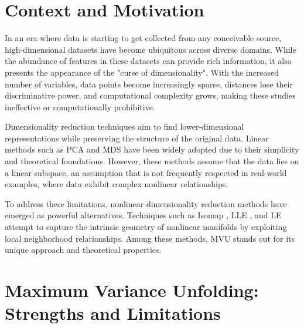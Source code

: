 \label{chap:Introduction}

\section{Context and Motivation}

In an era where data is starting to get collected from any conceivable source, high-dimensional datasets have become ubiquitous across diverse domains. While the abundance of features in these datasets can provide rich information, it also presents the appearance of the "curse of dimensionality". With the increased number of variables, data points become increasingly sparse, distances lose their discriminative power, and computational complexity grows, making these studies ineffective or computationally prohibitive.


Dimensionality reduction techniques aim to find lower-dimensional representations while preserving the structure of the original data. Linear methods such as \ac{PCA} \cite{pca} and \ac{MDS} \cite{mds} have been widely adopted due to their simplicity and theoretical foundations. However, these methods assume that the data lies on a linear subspace, an assumption that is not frequently respected in real-world examples, where data exhibit complex nonlinear relationships.

To address these limitations, nonlinear dimensionality reduction methods have emerged as powerful alternatives. Techniques such as \ac{Isomap} \cite{isomap}, \ac{LLE} \cite{lle}, and \ac{LE} \cite{le} attempt to capture the intrinsic geometry of nonlinear manifolds by exploiting local neighborhood relationships. Among these methods, \ac{MVU} \cite{mvu} stands out for its unique approach and theoretical properties.

\section{Maximum Variance Unfolding: Strengths and Limitations}


